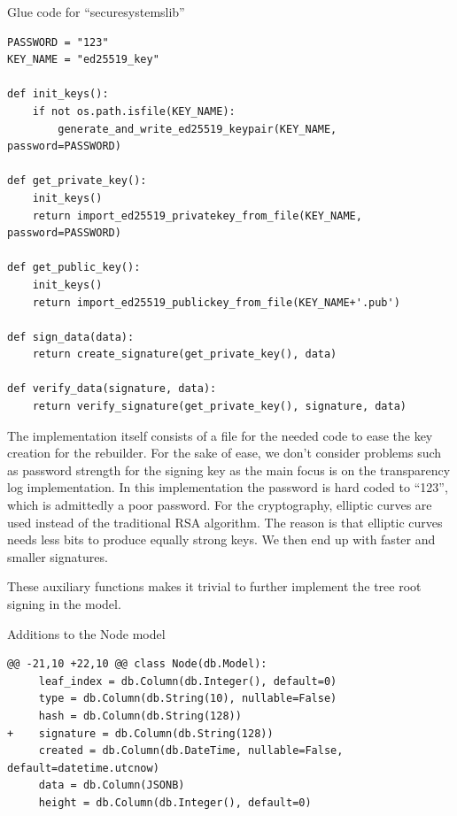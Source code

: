 \documentclass[../Main/thesis.tex]{subfiles}
\begin{document}
\begin{listing}[H]
\caption{Glue code for ``securesystemslib''}
\label{lst:securesystemslib_glue}
\begin{verbatim}
PASSWORD = "123"
KEY_NAME = "ed25519_key"

def init_keys():
    if not os.path.isfile(KEY_NAME):
        generate_and_write_ed25519_keypair(KEY_NAME, password=PASSWORD)

def get_private_key():
    init_keys()
    return import_ed25519_privatekey_from_file(KEY_NAME, password=PASSWORD)

def get_public_key():
    init_keys()
    return import_ed25519_publickey_from_file(KEY_NAME+'.pub')

def sign_data(data):
    return create_signature(get_private_key(), data)

def verify_data(signature, data):
    return verify_signature(get_private_key(), signature, data)
\end{verbatim}
\end{listing}

The implementation itself consists of a file for the needed code to ease the key
creation for the rebuilder. For the sake of ease, we don't consider problems
such as password strength for the signing key as the main focus is on the
transparency log implementation. In this implementation the password is hard
coded to ``123'', which is admittedly a poor password. For the cryptography,
elliptic curves are used instead of the traditional RSA algorithm. The reason is
that elliptic curves needs less bits to produce equally strong keys. We then end
up with faster and smaller signatures.

These auxiliary functions makes it trivial to further implement the tree root
signing in the model.

\begin{listing}[H]
\caption{Additions to the Node model}
\label{lst:node_tree_root_signature}
\begin{verbatim}
@@ -21,10 +22,10 @@ class Node(db.Model):
     leaf_index = db.Column(db.Integer(), default=0)
     type = db.Column(db.String(10), nullable=False)
     hash = db.Column(db.String(128))
+    signature = db.Column(db.String(128))
     created = db.Column(db.DateTime, nullable=False, default=datetime.utcnow)
     data = db.Column(JSONB)
     height = db.Column(db.Integer(), default=0)
\end{verbatim}
\end{listing}
\end{document}
